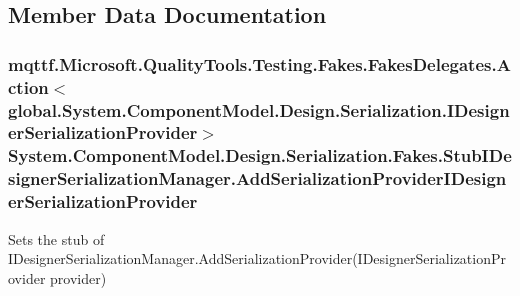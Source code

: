 \subsection{Member Data Documentation}
\hypertarget{class_system_1_1_component_model_1_1_design_1_1_serialization_1_1_fakes_1_1_stub_i_designer_serialization_manager_ae7c08b5a01747868294f30e6892adc58}{
\subsubsection[{Add\-Serialization\-Provider\-I\-Designer\-Serialization\-Provider}]{\setlength{\rightskip}{0pt plus 5cm}mqttf.\-Microsoft.\-Quality\-Tools.\-Testing.\-Fakes.\-Fakes\-Delegates.\-Action$<$global.\-System.\-Component\-Model.\-Design.\-Serialization.\-I\-Designer\-Serialization\-Provider$>$ System.\-Component\-Model.\-Design.\-Serialization.\-Fakes.\-Stub\-I\-Designer\-Serialization\-Manager.\-Add\-Serialization\-Provider\-I\-Designer\-Serialization\-Provider}}\label{class_system_1_1_component_model_1_1_design_1_1_serialization_1_1_fakes_1_1_stub_i_designer_serialization_manager_ae7c08b5a01747868294f30e6892adc58}


Sets the stub of I\-Designer\-Serialization\-Manager.\-Add\-Serialization\-Provider(\-I\-Designer\-Serialization\-Provider provider)

